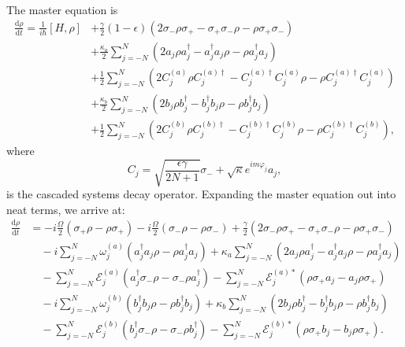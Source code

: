\documentclass{article}
\newcommand{\ddt}[1][]{\frac{\mathrm{d} #1}{\mathrm{d}t}}
\begin{document}
The master equation is
\begin{align}\label{master_equation_full}
	\ddt[\rho] = \frac{1}{i \hbar} [H, \rho] &+ \frac{\gamma}{2}(1 - \epsilon) \left(2 \sigma_{-} \rho \sigma_{+} - \sigma_{+} \sigma_{-} \rho - \rho \sigma_{+} \sigma_{-}\right) \nonumber \\
	&+ \frac{\kappa_{a}}{2} \sum_{j=-N}^{N} \left( 2 a_{j} \rho a^{\dagger}_{j} - a^{\dagger}_{j} a_{j} \rho - \rho a^{\dagger}_{j} a_{j} \right) \\
	&+ \frac{1}{2} \sum_{j=-N}^{N} \left(2 C_{j}^{(a)} \rho C^{(a) \dagger}_{j} - C^{(a) \dagger}_{j} C_{j}^{(a)} \rho - \rho C^{(a) \dagger}_{j} C_{j}^{(a)} \right) \nonumber \\
	&+ \frac{\kappa_{b}}{2} \sum_{j=-N}^{N} \left( 2 b_{j} \rho b^{\dagger}_{j} - b^{\dagger}_{j} b_{j} \rho - \rho b^{\dagger}_{j} b_{j} \right) \\
	&+ \frac{1}{2} \sum_{j=-N}^{N} \left(2 C_{j}^{(b)} \rho C^{(b) \dagger}_{j} - C^{(b) \dagger}_{j} C_{j}^{(b)} \rho - \rho C^{(b) \dagger}_{j} C_{j}^{(b)} \right), \nonumber
\end{align}
where
\begin{equation}
	C_{j} = \sqrt{\frac{\epsilon \gamma}{2N + 1}} \sigma_{-} + \sqrt{\kappa} e^{i m \varphi_{j}} a_{j},
\end{equation}
is the cascaded systems decay operator. Expanding the master equation out into neat terms, we arrive at:
\begin{align}
	\ddt[\rho] &= -i \frac{\Omega}{2} \left( \sigma_{+}\rho - \rho \sigma_{+} \right) - i \frac{\Omega}{2} \left( \sigma_{-} \rho - \rho \sigma_{-} \right) + \frac{\gamma}{2} \left( 2 \sigma_{-} \rho \sigma_{+} - \sigma_{+} \sigma_{-} \rho - \rho \sigma_{+} \sigma_{-} \right) \nonumber \\
	&\quad -i \sum_{j=-N}^{N} \omega_{j}^{(a)} \left( a^{\dagger}_{j} a_{j} \rho - \rho a^{\dagger}_{j} a_{j} \right) + \kappa_{a} \sum_{j=-N}^{N} \left( 2 a_{j} \rho a^{\dagger}_{j} - a^{\dagger}_{j} a_{j} \rho - \rho a^{\dagger}_{j} a_{j} \right) \nonumber \\
	&\quad - \sum_{j=-N}^{N} \mathcal{E}_{j}^{(a)} \left( a^{\dagger}_{j} \sigma_{-} \rho - \sigma_{-} \rho a^{\dagger}_{j} \right) - \sum_{j=-N}^{N} \mathcal{E}_{j}^{(a) *} \left( \rho \sigma_{+} a_{j} - a_{j} \rho \sigma_{+} \right) \nonumber \\
	&\quad -i \sum_{j=-N}^{N} \omega_{j}^{(b)} \left( b^{\dagger}_{j} b_{j} \rho - \rho b^{\dagger}_{j} b_{j} \right) + \kappa_{b} \sum_{j=-N}^{N} \left( 2 b_{j} \rho b^{\dagger}_{j} - b^{\dagger}_{j} b_{j} \rho - \rho b^{\dagger}_{j} b_{j} \right) \nonumber \\
	&\quad - \sum_{j=-N}^{N} \mathcal{E}_{j}^{(b)} \left( b^{\dagger}_{j} \sigma_{-} \rho - \sigma_{-} \rho b^{\dagger}_{j} \right) - \sum_{j=-N}^{N} \mathcal{E}_{j}^{(b) *} \left( \rho \sigma_{+} b_{j} - b_{j} \rho \sigma_{+} \right) .
\end{align}
\end{document}
